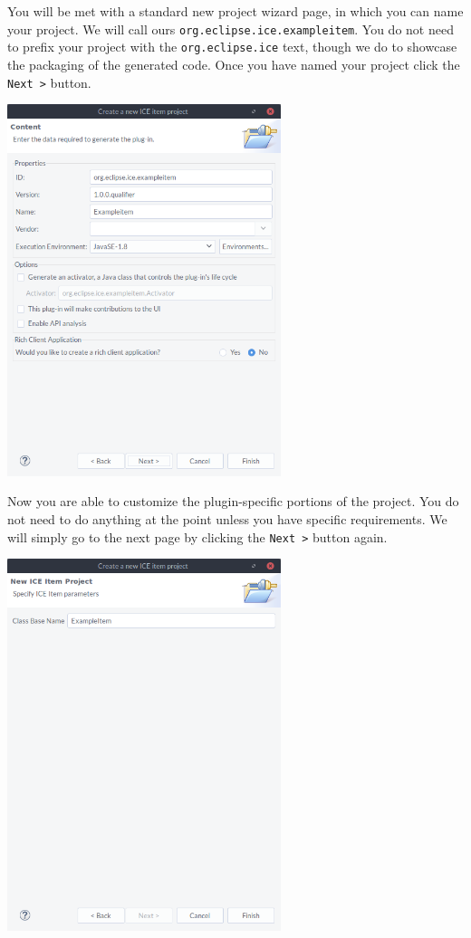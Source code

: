 \documentclass{article}
\begin{document}
You will be met with a standard new project wizard page, in which you can name
your project.  We will call ours \texttt{org.eclipse.ice.exampleitem}.  You do
not need to prefix your project with the \texttt{org.eclipse.ice} text, though
we do to showcase the packaging of the generated code.  Once you have named
your project click the \texttt{Next >} button.

\begin{center}
\includegraphics[width=8cm]{images/4}
\end{center}

Now you are able to customize the plugin-specific portions of the project.  You
do not need to do anything at the point unless you have specific requirements.
We will simply go to the next page by clicking the \texttt{Next >} button
again.

\begin{center}
\includegraphics[width=8cm]{images/5}
\end{center}
\end{document}
